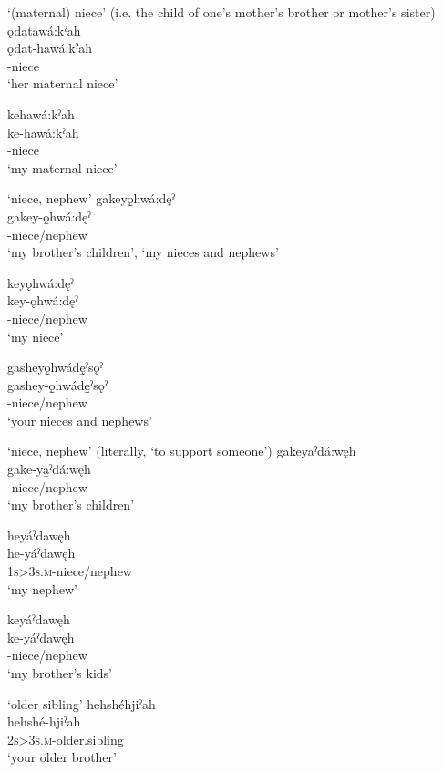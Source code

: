 \ea\label{ex:interkintermppex6}  ‘(maternal) niece’ (i.e. the child of one’s mother’s brother or mother’s sister)
\ea ǫdatawá:kˀah\\
\gll ǫdat-hawá:kˀah\\
 -niece\\
\glt `her maternal niece'

\ex kehawá:kˀah\\
\gll ke-hawá:kˀah\\
 -niece\\
\glt `my maternal niece'
\z
\z

\ea\label{ex:interkintermppex7}  ‘niece, nephew’
\ea gakeyǫ̱hwá:dęˀ \\
\gll gakey-ǫ̱hwá:dęˀ\\
 -niece/nephew\\
\glt ‘my brother’s children’, `my nieces and nephews'

\ex keyǫhwá:dęˀ\\
\gll key-ǫhwá:dęˀ\\
 -niece/nephew\\
\glt `my niece'

\ex gasheyǫ̱hwádę̱ˀsǫˀ\\
\gll gashey-ǫ̱hwádę̱ˀsǫˀ\\
-niece/nephew\\
\glt `your nieces and nephews'
\z
\z

\ea\label{ex:interkintermppex8}  ‘niece, nephew’ (literally, ‘to support someone’)
\ea gakeya̱ˀdá:węh \\
\gll gake-ya̱ˀdá:węh \\
  -niece/nephew \\
\glt ‘my brother’s children’ 

\newpage

\ex heyáˀdawęh\\
\gll he-yáˀdawęh\\
 \textsc{1s>3s.m}-niece/nephew\\
\glt `my nephew'

\ex keyáˀdawęh\\
\gll ke-yáˀdawęh\\
-niece/nephew\\
\glt ‘my brother’s kids’
\z
\z

\ea\label{ex:samegeninlawex2}  ‘older sibling’
\ea hehshéhjiˀah\\
\gll hehshé-hjiˀah\\
 \textsc{2s>3s.m}-older.sibling\\
\glt `your older brother'

